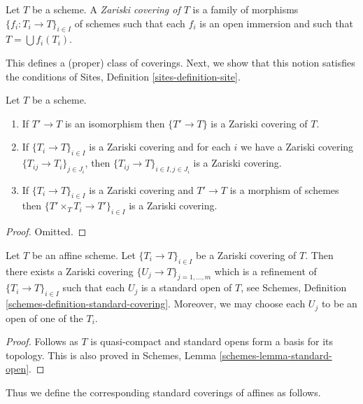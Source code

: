\begin{definition}
\label{definition-zariski-covering}
Let $T$ be a scheme. A {\it Zariski covering of $T$} is a family
of morphisms $\{f_i : T_i \to T\}_{i \in I}$ of schemes
such that each $f_i$ is an open immersion and such
that $T = \bigcup f_i(T_i)$.
\end{definition}

\noindent
This defines a (proper) class of coverings.
Next, we show that this notion satisfies the conditions of
Sites, Definition \ref{sites-definition-site}.

\begin{lemma}
\label{lemma-zariski}
Let $T$ be a scheme.
\begin{enumerate}
\item If $T' \to T$ is an isomorphism then $\{T' \to T\}$
is a Zariski covering of $T$.
\item If $\{T_i \to T\}_{i\in I}$ is a Zariski covering and for each
$i$ we have a Zariski covering $\{T_{ij} \to T_i\}_{j\in J_i}$, then
$\{T_{ij} \to T\}_{i \in I, j\in J_i}$ is a Zariski covering.
\item If $\{T_i \to T\}_{i\in I}$ is a Zariski covering
and $T' \to T$ is a morphism of schemes then
$\{T' \times_T T_i \to T'\}_{i\in I}$ is a Zariski covering.
\end{enumerate}
\end{lemma}

\begin{proof}
Omitted.
\end{proof}

\begin{lemma}
\label{lemma-zariski-affine}
Let $T$ be an affine scheme. Let $\{T_i \to T\}_{i \in I}$ be a
Zariski covering of $T$. Then there exists a Zariski covering
$\{U_j \to T\}_{j = 1, \ldots, m}$ which is a refinement
of $\{T_i \to T\}_{i \in I}$ such that each $U_j$ is a standard
open of $T$, see
Schemes, Definition \ref{schemes-definition-standard-covering}.
Moreover, we may choose each $U_j$ to be an open of one of the $T_i$.
\end{lemma}

\begin{proof}
Follows as $T$ is quasi-compact and standard opens form a basis
for its topology. This is also proved in
Schemes, Lemma \ref{schemes-lemma-standard-open}.
\end{proof}

\noindent
Thus we define the corresponding standard coverings of affines as follows.

